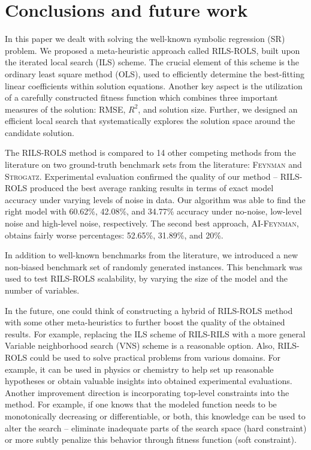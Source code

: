\documentclass{bmcart}
\begin{document}
\section{Conclusions and future work}\label{sec:conclusions}

In this paper we dealt with solving the well-known symbolic regression (SR)  problem.  
We proposed a meta-heuristic approach called \textsc{RILS}-\textsc{ROLS}, built upon the iterated local search (ILS) scheme. The crucial element of this scheme is the ordinary least square method (OLS), used to efficiently determine the best-fitting linear coefficients within solution equations. 
Another key aspect is the utilization of a carefully constructed fitness function which combines three important measures of the solution: RMSE, $R^2$, and solution size. 
Further, we designed an efficient local search that systematically explores the solution space around the candidate solution.

The \textsc{RILS-ROLS} method is compared to 14 other competing methods from the literature on two ground-truth benchmark sets from the literature: \textsc{Feynman} and \textsc{Strogatz}. Experimental evaluation confirmed the quality of our method -- \textsc{RILS-ROLS} produced the best average ranking results in terms of exact model accuracy under varying levels of noise in data. 
Our algorithm was able to find the right model with 60.62\%, 42.08\%, and 34.77\% accuracy under no-noise, low-level noise and high-level noise, respectively. The second best approach, \textsc{AI-Feynman}, obtains fairly worse percentages: 52.65\%, 31.89\%, and 20\%. 

In addition to well-known benchmarks from the literature, we introduced a new non-biased benchmark set of randomly generated instances.  %
This benchmark was used to test \textsc{RILS}-\textsc{ROLS} scalability, by varying the size of the model and the number of variables. 

In the future, one could think of constructing a hybrid of \textsc{RILS-ROLS} method with some other meta-heuristics to further boost the quality of the obtained results. For example, replacing the ILS scheme of \textsc{RILS-RILS} with a more general Variable neighborhood search (VNS) scheme is a reasonable option. Also, \textsc{RILS-ROLS} could be used to solve practical problems from various domains. For example, it can be used in physics or chemistry to help set up reasonable hypotheses or obtain valuable insights into obtained experimental evaluations. Another improvement direction is incorporating top-level constraints into the method. For example, if one knows that the modeled function needs to be monotonically decreasing or differentiable, or both, this knowledge can be used to alter the search -- eliminate inadequate parts of the search space (hard constraint) or more subtly penalize this behavior through fitness function (soft constraint). 
\end{document}
